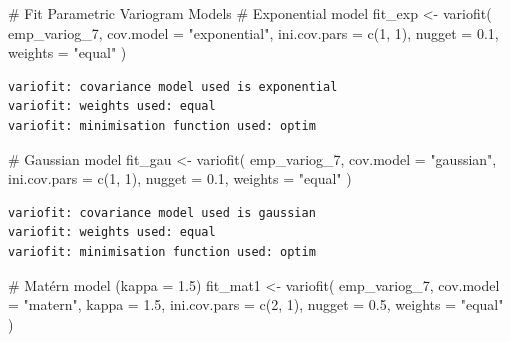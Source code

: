 \documentclass[
  11pt,
]{article}
\newenvironment{Shaded}{\begin{snugshade}}{\end{snugshade}}
\newcommand{\AttributeTok}[1]{\textcolor[rgb]{0.40,0.45,0.13}{#1}}
\newcommand{\CommentTok}[1]{\textcolor[rgb]{0.37,0.37,0.37}{#1}}
\newcommand{\DecValTok}[1]{\textcolor[rgb]{0.68,0.00,0.00}{#1}}
\newcommand{\FloatTok}[1]{\textcolor[rgb]{0.68,0.00,0.00}{#1}}
\newcommand{\FunctionTok}[1]{\textcolor[rgb]{0.28,0.35,0.67}{#1}}
\newcommand{\NormalTok}[1]{\textcolor[rgb]{0.00,0.23,0.31}{#1}}
\newcommand{\OtherTok}[1]{\textcolor[rgb]{0.00,0.23,0.31}{#1}}
\newcommand{\StringTok}[1]{\textcolor[rgb]{0.13,0.47,0.30}{#1}}
\begin{document}
\begin{Shaded}
\begin{Highlighting}[]
\CommentTok{\#  Fit Parametric Variogram Models}
\CommentTok{\# Exponential model}
\NormalTok{fit\_exp }\OtherTok{\textless{}{-}} \FunctionTok{variofit}\NormalTok{(}
\NormalTok{  emp\_variog\_7,}
  \AttributeTok{cov.model =} \StringTok{"exponential"}\NormalTok{,}
  \AttributeTok{ini.cov.pars =} \FunctionTok{c}\NormalTok{(}\DecValTok{1}\NormalTok{, }\DecValTok{1}\NormalTok{),}
  \AttributeTok{nugget =} \FloatTok{0.1}\NormalTok{,}
  \AttributeTok{weights =} \StringTok{"equal"}
\NormalTok{)}
\end{Highlighting}
\end{Shaded}

\begin{verbatim}
variofit: covariance model used is exponential 
variofit: weights used: equal 
variofit: minimisation function used: optim 
\end{verbatim}

\begin{Shaded}
\begin{Highlighting}[]
\CommentTok{\# Gaussian model}
\NormalTok{fit\_gau }\OtherTok{\textless{}{-}} \FunctionTok{variofit}\NormalTok{(}
\NormalTok{  emp\_variog\_7,}
  \AttributeTok{cov.model =} \StringTok{"gaussian"}\NormalTok{,}
  \AttributeTok{ini.cov.pars =} \FunctionTok{c}\NormalTok{(}\DecValTok{1}\NormalTok{, }\DecValTok{1}\NormalTok{),}
  \AttributeTok{nugget =} \FloatTok{0.1}\NormalTok{,}
  \AttributeTok{weights =} \StringTok{"equal"}
\NormalTok{)}
\end{Highlighting}
\end{Shaded}

\begin{verbatim}
variofit: covariance model used is gaussian 
variofit: weights used: equal 
variofit: minimisation function used: optim 
\end{verbatim}

\begin{Shaded}
\begin{Highlighting}[]
\CommentTok{\# Matérn model (kappa = 1.5)}
\NormalTok{fit\_mat1 }\OtherTok{\textless{}{-}} \FunctionTok{variofit}\NormalTok{(}
\NormalTok{  emp\_variog\_7,}
  \AttributeTok{cov.model =} \StringTok{"matern"}\NormalTok{,}
  \AttributeTok{kappa =} \FloatTok{1.5}\NormalTok{,}
  \AttributeTok{ini.cov.pars =} \FunctionTok{c}\NormalTok{(}\DecValTok{2}\NormalTok{, }\DecValTok{1}\NormalTok{),}
  \AttributeTok{nugget =} \FloatTok{0.5}\NormalTok{,}
  \AttributeTok{weights =} \StringTok{"equal"}
\NormalTok{)}
\end{Highlighting}
\end{Shaded}
\end{document}
